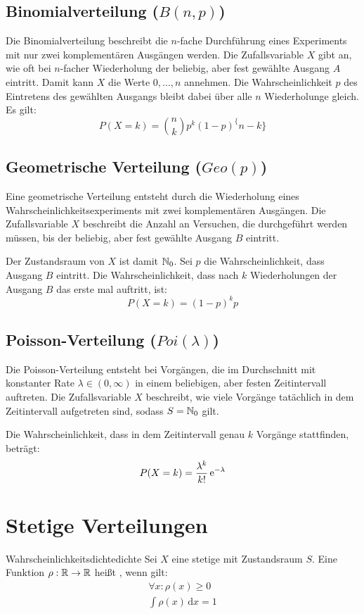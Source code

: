 \subsection{Binomialverteilung ($B(n,p)$)}

Die Binomialverteilung beschreibt die $n$-fache Durchführung eines Experiments
mit nur zwei komplementären Ausgängen werden. Die Zufallsvariable $X$ gibt an,
wie oft bei $n$-facher Wiederholung der beliebig, aber fest gewählte Ausgang $A$
eintritt. Damit kann $X$ die Werte $0, ..., n$ annehmen. Die Wahrscheinlichkeit
$p$ des Eintretens des gewählten Ausgangs bleibt dabei über alle $n$
Wiederholunge gleich. Es gilt:
\[P(X=k) = \binom{n}{k}p^k(1-p)^\{n-k\}\]


\subsection{Geometrische Verteilung ($Geo(p)$)}

Eine geometrische Verteilung entsteht durch die Wiederholung eines
Wahrscheinlichkeitsexperiments mit zwei komplementären Ausgängen. Die
Zufallsvariable $X$ beschreibt die Anzahl an Versuchen, die durchgeführt werden
müssen, bis der beliebig, aber fest gewählte Ausgang $B$ eintritt.

Der Zustandsraum von $X$ ist damit $\mathbb{N}_0$. Sei $p$ die Wahrscheinlichkeit, dass
Ausgang $B$ eintritt. Die Wahrscheinlichkeit, dass nach $k$ Wiederholungen der
Ausgang $B$ das erste mal auftritt, ist:
\[P(X=k) = (1-p)^kp\]


\subsection{Poisson-Verteilung ($Poi(\lambda)$)}

Die Poisson-Verteilung entsteht bei Vorgängen, die im Durchschnitt mit
konstanter Rate $\lambda \in (0, \infty)$ in einem beliebigen, aber
festen Zeitintervall auftreten. Die Zufallsvariable $X$ beschreibt, wie viele
Vorgänge tatächlich in dem Zeitintervall aufgetreten sind, sodass $S=\mathbb{N}_0$ gilt.

Die Wahrscheinlichkeit, dass in dem Zeitintervall genau $k$ Vorgänge
stattfinden, beträgt:
\[P(X=k) = \frac{\lambda^k}{k!}\,\mathrm{e}^{-\lambda}\]


\section{Stetige Verteilungen}

\begin{definition}{Wahrscheinlichkeitsdichte}{dichte}
Sei $X$ eine stetige  mit Zustandsraum $S$.
Eine Funktion $\rho: \mathbb{R} \rightarrow \mathbb{R}$ heißt ,
wenn gilt:
\begin{align*}
  \forall x: \rho(x) \ge 0 \\
  \int \rho(x) \,\mathrm{d}x = 1
\end{align*}
\end{definition}

